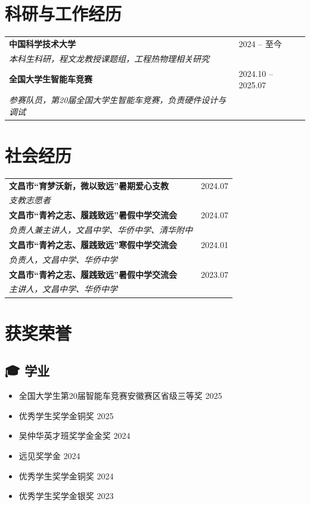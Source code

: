 \documentclass[11pt,a4paper]{article}
\begin{document}
\section{科研与工作经历}
\begin{tabular}{@{}p{}@{}p{}@{}}
  \textbf{中国科学技术大学} & 2024 -- 至今 \\
  \textit{本科生科研，程文龙教授课题组，工程热物理相关研究} \\
  \textbf{全国大学生智能车竞赛} & 2024.10 -- 2025.07 \\
  \textit{参赛队员，第20届全国大学生智能车竞赛，负责硬件设计与调试} \\
\end{tabular}

\section{社会经历}
\begin{tabular}{@{}p{}@{}p{}@{}}
  \textbf{文昌市“育梦沃新，微以致远”暑期爱心支教} & 2024.07 \\
  \textit{支教志愿者} \\
  \textbf{文昌市“青衿之志、履践致远”暑假中学交流会} & 2024.07 \\
  \textit{负责人兼主讲人，文昌中学、华侨中学、清华附中} \\
  \textbf{文昌市“青衿之志、履践致远”寒假中学交流会} & 2024.01 \\
  \textit{负责人，文昌中学、华侨中学} \\
  \textbf{文昌市“青衿之志、履践致远”暑假中学交流会} & 2023.07 \\
  \textit{主讲人，文昌中学、华侨中学} \\
\end{tabular}

\section{获奖荣誉}

\subsection*{🎓 学业}
\begin{itemize}
  \item 全国大学生第20届智能车竞赛安徽赛区省级三等奖 \hfill 2025
  \item 优秀学生奖学金铜奖 \hfill 2025
  \item 吴仲华英才班奖学金金奖 \hfill 2024
  \item 远见奖学金 \hfill 2024
  \item 优秀学生奖学金铜奖 \hfill 2024
  \item 优秀学生奖学金银奖 \hfill 2023
\end{itemize}
\end{document}
